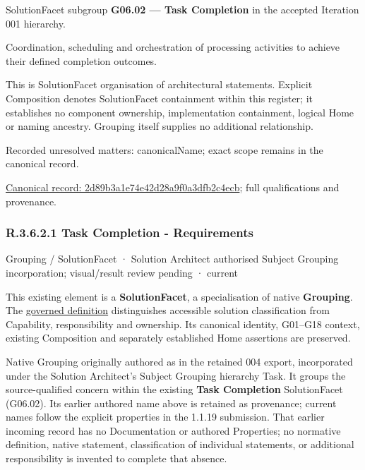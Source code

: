 SolutionFacet subgroup \textbf{G06.02 — Task Completion} in the accepted Iteration 001 hierarchy.



Coordination, scheduling and orchestration of processing activities to achieve their defined completion outcomes.



This is SolutionFacet organisation of architectural statements. Explicit Composition denotes SolutionFacet containment within this register; it establishes no component ownership, implementation containment, logical Home or naming ancestry. Grouping itself supplies no additional relationship.


{\small Recorded unresolved matters: canonicalName; exact scope remains in the canonical record.}\par
{\footnotesize \href{../../../../../../../continuum/grouping/2d89b3a1e74e42d28a9f0a3dfb2c4ecb.md}{Canonical record: 2d89b3a1e74e42d28a9f0a3dfb2c4ecb}; full qualifications and provenance.}\par
\subsubsection*{R.3.6.2.1 Task Completion - Requirements}
\label{navigation:R.3.6.2.1}

\label{element:5280c9c5e5ac43fe8fd314fd74bb6e69}
{\small Grouping / SolutionFacet · Solution Architect authorised Subject Grouping incorporation; visual/result review pending · current}\par

This existing element is a \textbf{SolutionFacet}, a specialisation of native
\textbf{Grouping}. The \href{\detokenize{../../../../../../../governance/continuum-representation.md#solutionfacet-classification--1119-candidate}}{governed definition}
distinguishes accessible solution classification from Capability, responsibility
and ownership. Its canonical identity, G01–G18 context, existing Composition
and separately established Home assertions are preserved.



Native Grouping originally authored as \texttt{} in the retained 004 export,
incorporated under the Solution Architect's Subject Grouping hierarchy Task.
It groups the source-qualified \texttt{} concern within
the existing \textbf{Task Completion} SolutionFacet (G06.02). Its earlier authored name above is retained as provenance; current names
follow the explicit properties in the 1.1.19 submission.
That earlier incoming record has no Documentation or authored Properties; no normative
definition, native statement, classification of individual statements, or
additional responsibility is invented to complete that absence.



